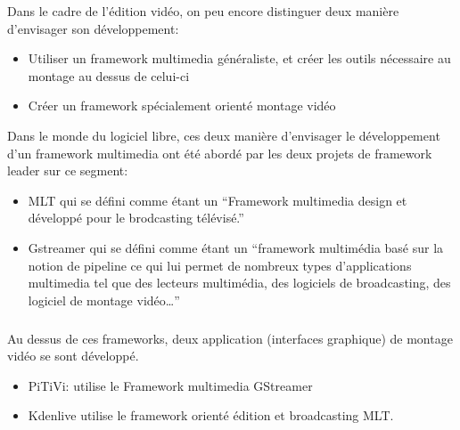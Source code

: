 Dans le cadre de l'édition vidéo, on peu encore distinguer deux manière
d'envisager son développement:

\begin {itemize}

  \item {Utiliser un framework multimedia généraliste, et créer les
  outils nécessaire
         au montage au dessus de celui-ci} %

  \item {Créer un framework spécialement orienté montage vidéo}

\end {itemize}

Dans le monde du logiciel libre, ces deux manière d'envisager le
développement d'un framework multimedia ont été abordé par les deux
projets de framework leader sur ce segment:

\begin {itemize}

  \item {MLT qui se défini comme étant un ``Framework multimedia design
    et développé pour le brodcasting télévisé.''}

  \item {Gstreamer qui se défini comme étant un ``framework multimédia
    basé sur la notion de pipeline ce qui lui permet de nombreux types
    d'applications multimedia tel que des lecteurs multimédia, des
    logiciels de broadcasting, des logiciel de montage vidéo\ldots''}

\end {itemize}

\subparagraph {}

Au dessus de ces frameworks, deux application (interfaces graphique)
de montage vidéo se sont développé.

\begin {itemize}

  \item {PiTiVi: utilise le Framework multimedia GStreamer}

  \item {Kdenlive utilise le framework orienté édition et
    broadcasting MLT.}

\end {itemize}

\paragraph {}

